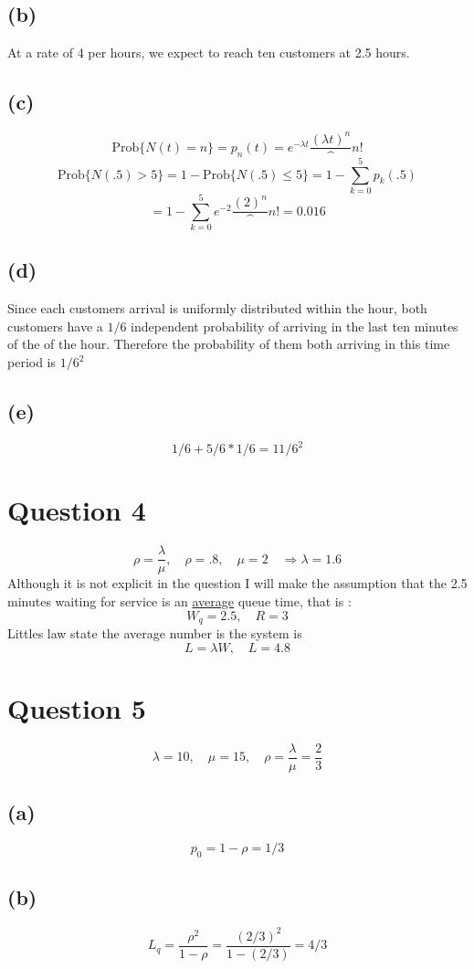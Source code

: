 \documentclass{article}
\begin{document}
\subsection*{(b)}
At a rate of 4 per hours, we expect to reach ten customers at 2.5 hours. 
\subsection*{(c)}
\[\mbox{Prob}\{N(t) = n \} = p_n(t) = e^{-\lambda t}\frac{(\lambda
t)^{n}}^{n!}\]
\[\mbox{Prob}\{N(.5) > 5 \} = 1 - \mbox{Prob}\{N(.5) \leq 5 \} = 1 -
\sum\limits_{k=0}^{5}p_{k}(.5)\]
\[ =1 - \sum\limits_{k=0}^{5}{e^{-2}\frac{(2)^{n}}^{n!}} = \boxed{0.016}\]
\subsection*{(d)}
Since each customers arrival is uniformly distributed within the hour, both
customers have a $1/6$ independent probability of arriving in the last ten
minutes of the of the hour. Therefore the probability of them both arriving in
this time period is $\boxed{1/6^2}$
\subsection*{(e)}	
\[ 1/6 + 5/6*1/6 = \boxed{11/6^2}\]
\section*{Question 4}
\[ \rho = \frac{\lambda}{\mu}, \quad \rho = .8, \quad \mu = 2 \quad \Rightarrow
\lambda = 1.6\]
Although it is not explicit in the question I will make the assumption that the
2.5 minutes waiting for service is an \underline{average} queue time, that is : 
\[W_q = 2.5, \quad \boxed{R = 3} \]
Littles law state the average number is the system is 
\[L = \lambda W, \quad \boxed{L = 4.8}\]
\newpage
\section*{Question 5}
\[\lambda = 10, \quad \mu = 15, \quad \rho = \frac{\lambda}{\mu} = \frac{2}{3}
\]
\subsection*{(a)}
\[ p_0 = 1 - \rho = \boxed{1/3} \]
\subsection*{(b)}
\[ L_q = \frac{\rho^2}{1 - \rho} = \frac{\left(2/3\right)^2}{1 -
\left(2/3\right)} = \boxed{4/3}
\]
\end{document}
